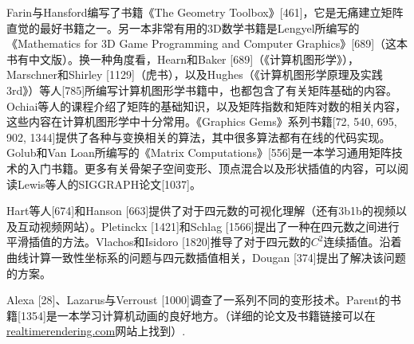 \documentclass[
  paper=a4,
  ,captions=tableheading
]{scrartcl}
\begin{document}
Farin与Hansford编写了书籍《The Geometry
Toolbox》{[}461{]}，它是无痛建立矩阵直觉的最好书籍之一。另一本非常有用的3D数学书籍是Lengyel所编写的《Mathematics
for 3D Game Programming and Computer
Graphics》{[}689{]}（这本书有中文版）。换一种角度看，Hearn和Baker
{[}689{]}（《计算机图形学》），Marschner和Shirley
{[}1129{]}（虎书），以及Hughes（《计算机图形学原理及实践
3rd》）等人{[}785{]}所编写计算机图形学书籍中，也都包含了有关矩阵基础的内容。Ochiai等人的课程介绍了矩阵的基础知识，以及矩阵指数和矩阵对数的相关内容，这些内容在计算机图形学中十分常用。《Graphics
Gems》系列书籍{[}72, 540, 695, 902,
1344{]}提供了各种与变换相关的算法，其中很多算法都有在线的代码实现。Golub和Van
Loan所编写的《Matrix
Computations》{[}556{]}是一本学习通用矩阵技术的入门书籍。更多有关骨架子空间变形、顶点混合以及形状插值的内容，可以阅读Lewis等人的SIGGRAPH论文{[}1037{]}。

Hart等人{[}674{]}和Hanson
{[}663{]}提供了对于四元数的可视化理解（还有3b1b的视频以及互动视频网站）。Pletinckx
{[}1421{]}和Schlag
{[}1566{]}提出了一种在四元数之间进行平滑插值的方法。Vlachos和Isidoro
{[}1820{]}推导了对于四元数的\(C^2\)连续插值。沿着曲线计算一致性坐标系的问题与四元数插值相关，Dougan
{[}374{]}提出了解决该问题的方案。

Alexa {[}28{]}、Lazarus与Verroust
{[}1000{]}调查了一系列不同的变形技术。Parent的书籍{[}1354{]}是一本学习计算机动画的良好地方。（详细的论文及书籍链接可以在\href{http://realtimerendering.com}{realtimerendering.com}网站上找到）.
\end{document}
